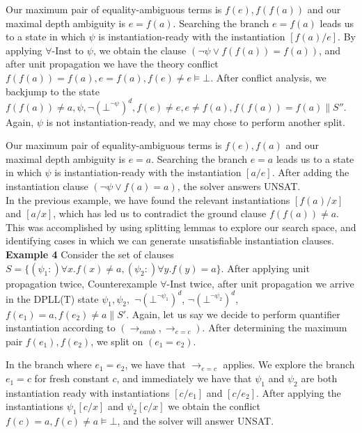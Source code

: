 \documentclass{llncs}
\begin{document}
Our maximum pair of equality-ambiguous terms is $f( e ), f( f( a ) )$ and our maximal depth ambiguity is $e = f( a )$.
Searching the branch $e = f( a )$ leads us to a state in which $\psi$ is instantiation-ready with the instantiation $[f(a)/e]$.
By applying $\forall$-Inst to $\psi$, we obtain the clause $( \neg \psi \vee f( f( a ) ) = f( a ) )$, and after unit propagation we have the theory conflict $f( f( a ) ) = f( a ), e = f( a ), f( e ) \neq e \models \bot$.
After conflict analysis, we backjump to the state $f( f( a ) ) \neq a, \psi, \neg (\bot^{\neg \psi})^d, f(e) \neq e, e \neq f( a ), f( f( a ) ) = f( a ) \parallel S''$.
Again, $\psi$ is not instantiation-ready, and we may chose to perform another split.

Our maximum pair of equality-ambiguous terms is $f( e ), f( a )$ and our maximal depth ambiguity is $e = a$.
Searching the branch $e = a$ leads us to a state in which $\psi$ is instantiation-ready with the instantiation $[a/e]$.
After adding the instantiation clause $( \neg \psi \vee f( a ) = a )$, the solver answers UNSAT. \\

In the previous example, we have found the relevant instantiations $[f(a)/x]$ and $[a/x]$, which has led us to contradict the ground clause $f( f( a ) ) \neq a$.
This was accomplished by using splitting lemmas to explore our search space, and identifying cases in which we can generate unsatisfiable instantiation clauses. \\

{\bf Example 4}
Consider the set of clauses $S = \{ (\psi_1 :)\forall x. f(x) \neq a, (\psi_2 :)\forall y. f(y) = a \}$.
After applying unit propagation twice, Counterexample $\forall$-Inst twice, after unit propagation we arrive in the DPLL(T) state $\psi_1, \psi_2,$ $\neg (\bot^{\neg \psi_1})^d$, $\neg (\bot^{\neg \psi_2})^d$, $f(e_1) = a, f(e_2) \neq a \parallel S'$.
Again, let us say we decide to perform quantifier instantiation according to $( \rightarrow_{eamb}, \rightarrow_{e=c} )$.
After determining the maximum pair $f(e_1),f(e_2)$, we split on $( e_1 = e_2 )$.

In the branch where $e_1 = e_2$, we have that $\rightarrow_{e=c}$ applies.
We explore the branch $e_1 = c$ for fresh constant $c$, and immediately we have that $\psi_1$ and $\psi_2$ are both instantiation ready with instantiations $[c/e_1]$ and $[c/e_2]$.
After applying the instantiations $\psi_1[c/x]$ and $\psi_2[c/x]$ we obtain the conflict $f( c ) = a, f( c ) \neq a \models \bot$, and the solver will answer UNSAT. \\
\end{document}
